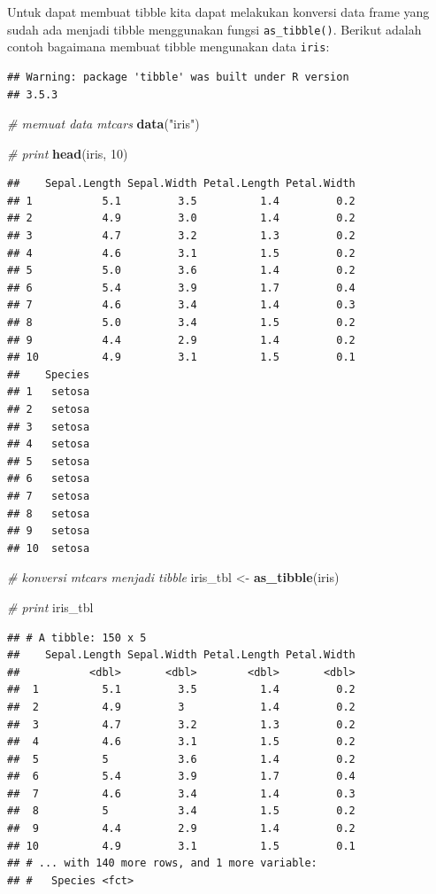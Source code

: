 \documentclass[]{book}
\newenvironment{Shaded}{\begin{snugshade}}{\end{snugshade}}
\newcommand{\KeywordTok}[1]{\textcolor[rgb]{0.13,0.29,0.53}{\textbf{#1}}}
\newcommand{\DecValTok}[1]{\textcolor[rgb]{0.00,0.00,0.81}{#1}}
\newcommand{\StringTok}[1]{\textcolor[rgb]{0.31,0.60,0.02}{#1}}
\newcommand{\CommentTok}[1]{\textcolor[rgb]{0.56,0.35,0.01}{\textit{#1}}}
\newcommand{\NormalTok}[1]{#1}
\begin{document}
Untuk dapat membuat tibble kita dapat melakukan konversi data frame yang
sudah ada menjadi tibble menggunakan fungsi \texttt{as\_tibble()}.
Berikut adalah contoh bagaimana membuat tibble mengunakan data
\texttt{iris}:

\begin{verbatim}
## Warning: package 'tibble' was built under R version
## 3.5.3
\end{verbatim}

\begin{Shaded}
\begin{Highlighting}[]
\CommentTok{# memuat data mtcars}
\KeywordTok{data}\NormalTok{(}\StringTok{"iris"}\NormalTok{)}

\CommentTok{# print}
\KeywordTok{head}\NormalTok{(iris, }\DecValTok{10}\NormalTok{)}
\end{Highlighting}
\end{Shaded}

\begin{verbatim}
##    Sepal.Length Sepal.Width Petal.Length Petal.Width
## 1           5.1         3.5          1.4         0.2
## 2           4.9         3.0          1.4         0.2
## 3           4.7         3.2          1.3         0.2
## 4           4.6         3.1          1.5         0.2
## 5           5.0         3.6          1.4         0.2
## 6           5.4         3.9          1.7         0.4
## 7           4.6         3.4          1.4         0.3
## 8           5.0         3.4          1.5         0.2
## 9           4.4         2.9          1.4         0.2
## 10          4.9         3.1          1.5         0.1
##    Species
## 1   setosa
## 2   setosa
## 3   setosa
## 4   setosa
## 5   setosa
## 6   setosa
## 7   setosa
## 8   setosa
## 9   setosa
## 10  setosa
\end{verbatim}

\begin{Shaded}
\begin{Highlighting}[]
\CommentTok{# konversi mtcars menjadi tibble}
\NormalTok{iris_tbl <-}\StringTok{ }\KeywordTok{as_tibble}\NormalTok{(iris)}

\CommentTok{# print}
\NormalTok{iris_tbl}
\end{Highlighting}
\end{Shaded}

\begin{verbatim}
## # A tibble: 150 x 5
##    Sepal.Length Sepal.Width Petal.Length Petal.Width
##           <dbl>       <dbl>        <dbl>       <dbl>
##  1          5.1         3.5          1.4         0.2
##  2          4.9         3            1.4         0.2
##  3          4.7         3.2          1.3         0.2
##  4          4.6         3.1          1.5         0.2
##  5          5           3.6          1.4         0.2
##  6          5.4         3.9          1.7         0.4
##  7          4.6         3.4          1.4         0.3
##  8          5           3.4          1.5         0.2
##  9          4.4         2.9          1.4         0.2
## 10          4.9         3.1          1.5         0.1
## # ... with 140 more rows, and 1 more variable:
## #   Species <fct>
\end{verbatim}
\end{document}
